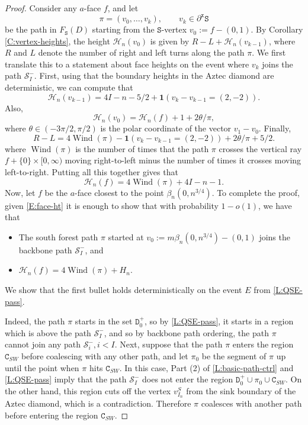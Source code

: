 \documentclass[11pt,twoside]{amsart}
\theoremstyle{plain}
\numberwithin{quest}{section}
\theoremstyle{remark}
\numberwithin{rem}{section}
\theoremstyle{definition}
\newcommand{\cS}{\mathcal{S}}
\newcommand{\cH}{\mathcal{H}}
\renewcommand{\tt}[1]{{\mathtt{#1}}}
\begin{document}
	\begin{proof}
		Consider any $a$-face $f$, and let
		$$
		\pi = (v_0, \dots, v_k), \qquad v_k \in \partial^\tt{x} \tt{S}
		$$
		be the path in $F_\tt{S}(D)$ starting from the $\tt{S}$-vertex $v_0 := f - (0, 1)$. By Corollary \ref{C:vertex-heights}, the height $\cH_n(v_0)$ is given by $R - L + \cH_n(v_{k-1})$, where $R$ and $L$ denote the number of right and left turns along the path $\pi$. We first translate this to a statement about face heights on the event where $v_k$ joins the path $\cS_I^-$.
		First, using that the boundary heights in the Aztec diamond are deterministic, we can compute that
		\begin{equation*}
\cH_n(v_{k-1}) = 4I - n - 5/2 + \mathbf{1}(v_k - v_{k-1} = (2, -2)).
		\end{equation*}
Also,
	$$
		\cH_n(v_0) = \cH_n(f) + 1 + 2\theta /\pi,
		$$
		where $\theta \in (-3\pi/2, \pi/2)$ is the polar coordinate of the vector $v_1 - v_0$. Finally, 
		$$
		R - L = 4 \operatorname{Wind}(\pi) - \mathbf{1}(v_k - v_{k-1} = (2, -2)) + 2\theta/\pi + 5/2. 
		$$
		where $\operatorname{Wind}(\pi)$ is the number of times that the path $\pi$ crosses the vertical ray $f + \{0\} \times [0, \infty)$ moving right-to-left minus the number of times it crosses moving left-to-right. Putting all this together gives that
		\begin{equation}
		\label{E:face-ht}
		\cH_n(f) = 4 \operatorname{Wind}(\pi) + 4 I - n - 1.
		\end{equation}
		Now, let $f$ be the $a$-face closest to the point $\beta_n(0, n^{3/4})$. To complete the proof, given \eqref{E:face-ht} it is enough to show that with probability $1 - o(1)$, we have that
		\begin{itemize}[nosep]
			\item The south forest path $\pi$ started at $v_0 :=m \beta_n(0, n^{3/4}) - (0, 1)$ joins the backbone path $\cS_I^-$, and
			\item $\cH_n(f) = 4 \operatorname{Wind}(\pi) + H_n$.
		\end{itemize}
		We show that the first bullet holds deterministically on the event $E$ from \cref{L:QSE-pass}. 
		
		Indeed, the path $\pi$ starts in the set $\tt{D}_0^+$, so by \cref{L:QSE-pass}, it starts in a region which is above the path $\cS_I^-$, and so by backbone path ordering, the path $\pi$ cannot join any path $\cS_i^-, i < I$. Next, suppose that the path $\pi$ enters the region $\tt{C}_{SW}$ before coalescing with any other path, and let $\pi_0$ be the segment of $\pi$ up until the point when $\pi$ hits $\tt{C}_{SW}$.  In this case, Part (2) of \cref{L:basic-path-ctrl} and \cref{L:QSE-pass} imply that the path $\cS_I^-$ does not enter the region $\tt{D}_0^+ \cup \pi_0 \cup \tt{C}_{SW}$. On the other hand, this region cuts off the vertex $v^S_{I_n}$ from the sink boundary of the Aztec diamond, which is a contradiction. Therefore $\pi$ coalesces with another path before entering the region $\tt{C}_{SW}$. 
		

\end{proof}
\end{document}
